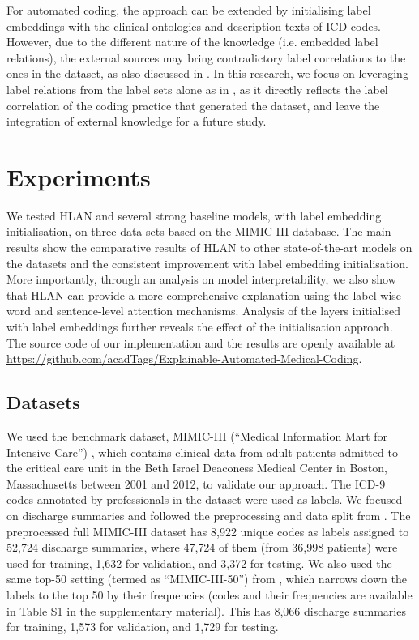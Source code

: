 \documentclass[final,5p,times,twocolumn]{elsarticle}
\begin{document}
For automated coding, the approach can be extended by initialising label embeddings with the clinical ontologies and description texts of ICD codes. However, due to the different nature of the knowledge (i.e. embedded label relations), the external sources may bring contradictory label correlations to the ones in the dataset, as also discussed in \cite{song2019}. In this research, we focus on leveraging label relations from the label sets alone as in \cite{kurata-etal-2016-improved,baker-korhonen-2017-initializing}, as it directly reflects the label correlation of the coding practice that generated the dataset, and leave the integration of external knowledge for a future study.

\section{Experiments}
\label{experiment}

We tested HLAN and several strong baseline models, with label embedding initialisation, on three data sets based on the MIMIC-III database. The main results show the comparative results of HLAN to other state-of-the-art models on the datasets and the consistent improvement with label embedding initialisation. More importantly, through an analysis on model interpretability, we also show that HLAN can provide a more comprehensive explanation using the label-wise word and sentence-level attention mechanisms. Analysis of the layers initialised with label embeddings further reveals the effect of the initialisation approach. The source code of our implementation and the results are openly available at \url{https://github.com/acadTags/Explainable-Automated-Medical-Coding}.

\subsection{Datasets}
\label{subsec:data}
We used the benchmark dataset, MIMIC-III (``Medical Information Mart for Intensive Care'') \cite{johnson_mimic-iii_2016}, which contains clinical data from adult patients admitted to the critical care unit in the Beth Israel Deaconess Medical Center in Boston, Massachusetts between 2001 and 2012, to validate our approach. The ICD-9 codes annotated by professionals in the dataset were used as labels. We focused on discharge summaries and followed the preprocessing and data split from \cite{mullenbach-etal-2018-explainable}. The preprocessed full MIMIC-III dataset has 8,922 unique codes as labels assigned to 52,724 discharge summaries, where 47,724 of them (from 36,998 patients) were used for training, 1,632 for validation, and 3,372 for testing. We also used the same top-50 setting (termed as ``MIMIC-III-50'') from \cite{mullenbach-etal-2018-explainable}, which narrows down the labels to the top 50 by their frequencies (codes and their frequencies are available in Table S1 in the supplementary material). This has 8,066 discharge summaries for training, 1,573 for validation, and 1,729 for testing.
\end{document}
